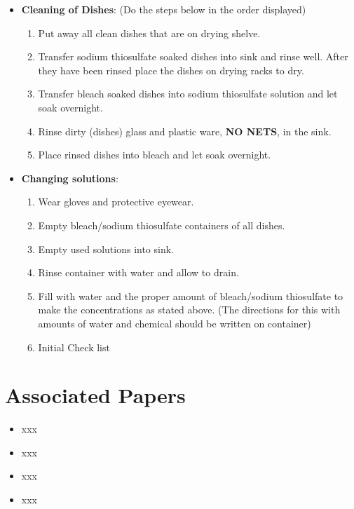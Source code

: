 \documentclass[
  letterpaper,
  DIV=11,
  numbers=noendperiod]{scrreprt}
\providecommand{\tightlist}{%
  \setlength{\itemsep}{0pt}\setlength{\parskip}{0pt}}\usepackage{longtable,booktabs,array}
\begin{document}
\begin{itemize}
\item
  \textbf{Cleaning of Dishes}: (Do the steps below in the order
  displayed)

  \begin{enumerate}
  \def\labelenumi{\arabic{enumi}.}
  \tightlist
  \item
    Put away all clean dishes that are on drying shelve.
  \item
    Transfer sodium thiosulfate soaked dishes into sink and rinse well.
    After they have been rinsed place the dishes on drying racks to dry.
  \item
    Transfer bleach soaked dishes into sodium thiosulfate solution and
    let soak overnight.
  \item
    Rinse dirty (dishes) glass and plastic ware, \textbf{NO NETS}, in
    the sink.
  \item
    Place rinsed dishes into bleach and let soak overnight.
  \end{enumerate}
\item
  \textbf{Changing solutions}:

  \begin{enumerate}
  \def\labelenumi{\arabic{enumi}.}
  \tightlist
  \item
    Wear gloves and protective eyewear.
  \item
    Empty bleach/sodium thiosulfate containers of all dishes.
  \item
    Empty used solutions into sink.
  \item
    Rinse container with water and allow to drain.
  \item
    Fill with water and the proper amount of bleach/sodium thiosulfate
    to make the concentrations as stated above. (The directions for this
    with amounts of water and chemical should be written on container)
  \item
    Initial Check list
  \end{enumerate}
\end{itemize}

\hypertarget{associated-papers-19}{%
\section{Associated Papers}\label{associated-papers-19}}

\begin{itemize}
\tightlist
\item
  xxx
\item
  xxx
\item
  xxx
\item
  xxx
\end{itemize}
\end{document}
